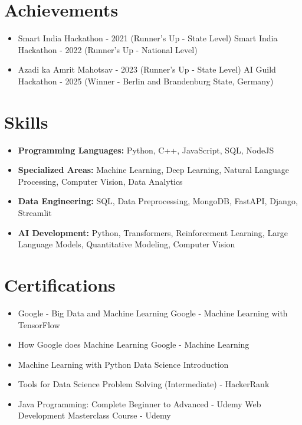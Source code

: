 \documentclass[a4paper,10pt]{article}
\begin{document}
\section*{Achievements}
\begin{itemize}
\item Smart India Hackathon - 2021 (Runner's Up - State Level) \hfill Smart India Hackathon - 2022 (Runner's Up - National Level)
\item Azadi ka Amrit Mahotsav - 2023 (Runner's Up - State Level) \hfill AI Guild Hackathon - 2025 (Winner - Berlin and Brandenburg State, Germany)
\end{itemize}

\section*{Skills}
\begin{itemize}
  \item \textbf{Programming Languages:} Python, C++, JavaScript, SQL, NodeJS
  \item \textbf{Specialized Areas:} Machine Learning, Deep Learning, Natural Language Processing, Computer Vision, Data Analytics
  \item \textbf{Data Engineering:} SQL, Data Preprocessing, MongoDB, FastAPI, Django, Streamlit
  \item \textbf{AI Development:} Python, Transformers, Reinforcement Learning, Large Language Models, Quantitative Modeling, Computer Vision
\end{itemize}

\section*{Certifications}
\begin{itemize}
\item Google - Big Data and Machine Learning \hfill Google - Machine Learning with TensorFlow
\item How Google does Machine Learning \hfill Google - Machine Learning
\item Machine Learning with Python \hfill Data Science Introduction
\item Tools for Data Science \hfill Problem Solving (Intermediate) - HackerRank
\item Java Programming: Complete Beginner to Advanced - Udemy \hfill Web Development Masterclass Course - Udemy
\end{itemize}
\end{document}
